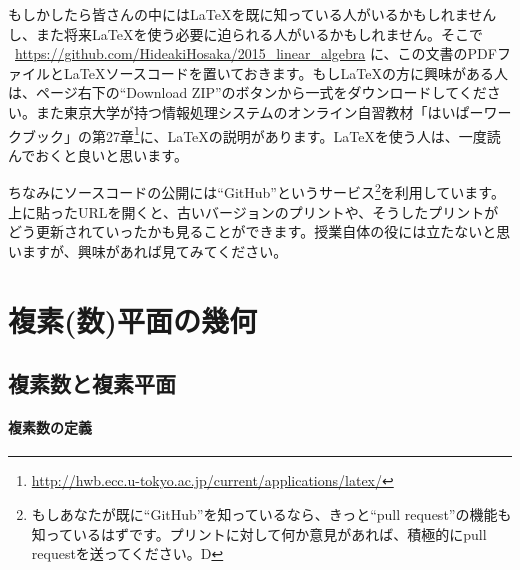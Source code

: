 もしかしたら皆さんの中には\LaTeX を既に知っている人がいるかもしれませんし、また将来\LaTeX を使う必要に迫られる人がいるかもしれません。そこで
\ \url{https://github.com/HideakiHosaka/2015_linear_algebra}
に、この文書のPDFファイルと\LaTeX ソースコードを置いておきます。もし\LaTeX の方に興味がある人は、ページ右下の``Download ZIP''のボタンから一式をダウンロードしてください。また東京大学が持つ情報処理システムのオンライン自習教材「はいぱーワークブック」の第27章\footnote{\url{http://hwb.ecc.u-tokyo.ac.jp/current/applications/latex/}}に、\LaTeX の説明があります。\LaTeX を使う人は、一度読んでおくと良いと思います。

ちなみにソースコードの公開には``GitHub''というサービス\footnote{もしあなたが既に``GitHub''を知っているなら、きっと``pull request''の機能も知っているはずです。プリントに対して何か意見があれば、積極的にpull requestを送ってください。\textsf{\raisebox{1pt}{:}D}}を利用しています。上に貼ったURLを開くと、古いバージョンのプリントや、そうしたプリントがどう更新されていったかも見ることができます。授業自体の役には立たないと思いますが、興味があれば見てみてください。

\section{複素(数)平面の幾何}

\subsection{複素数と複素平面}

\paragraph{複素数の定義}

